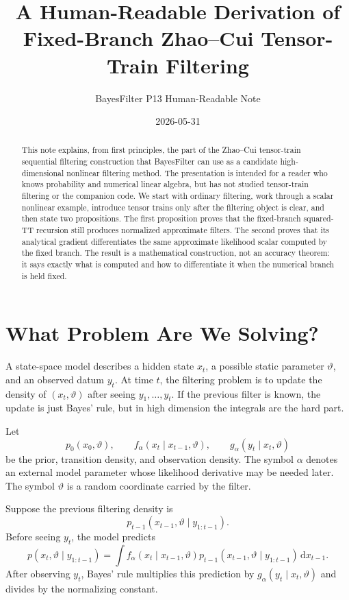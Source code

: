 \documentclass[11pt]{article}
\title{A Human-Readable Derivation of Fixed-Branch Zhao--Cui Tensor-Train Filtering}
\author{BayesFilter P13 Human-Readable Note}
\date{2026-05-31}
\newcommand{\dd}{\mathrm{d}}
\theoremstyle{definition}
\theoremstyle{remark}
\begin{document}
\maketitle

\begin{abstract}
This note explains, from first principles, the part of the Zhao--Cui
tensor-train sequential filtering construction that BayesFilter can use as a
candidate high-dimensional nonlinear filtering method.  The presentation is
intended for a reader who knows probability and numerical linear algebra, but
has not studied tensor-train filtering or the companion code.  We start with
ordinary filtering, work through a scalar nonlinear example, introduce tensor
trains only after the filtering object is clear, and then state two
propositions.  The first proposition proves that the fixed-branch squared-TT
recursion still produces normalized approximate filters.  The second proves
that its analytical gradient differentiates the same approximate likelihood
scalar computed by the fixed branch.  The result is a mathematical
construction, not an accuracy theorem: it says exactly what is computed and how
to differentiate it when the numerical branch is held fixed.
\end{abstract}

\section{What Problem Are We Solving?}

A state-space model describes a hidden state \(x_t\), a possible static
parameter \(\vartheta\), and an observed datum \(y_t\).  At time \(t\), the
filtering problem is to update the density of \((x_t,\vartheta)\) after seeing
\(y_1,\ldots,y_t\).  If the previous filter is known, the update is just
Bayes' rule, but in high dimension the integrals are the hard part.

Let
\[
  p_0(x_0,\vartheta),\qquad
  f_\alpha(x_t\mid x_{t-1},\vartheta),\qquad
  g_\alpha(y_t\mid x_t,\vartheta)
\]
be the prior, transition density, and observation density.  The symbol
\(\alpha\) denotes an external model parameter whose likelihood derivative may
be needed later.  The symbol \(\vartheta\) is a random coordinate carried by
the filter.

Suppose the previous filtering density is
\[
  p_{t-1}(x_{t-1},\vartheta\mid y_{1:t-1}).
\]
Before seeing \(y_t\), the model predicts
\[
  p(x_t,\vartheta\mid y_{1:t-1})
  =
  \int
  f_\alpha(x_t\mid x_{t-1},\vartheta)
  p_{t-1}(x_{t-1},\vartheta\mid y_{1:t-1})
  \,\dd x_{t-1}.
\]
After observing \(y_t\), Bayes' rule multiplies this prediction by
\(g_\alpha(y_t\mid x_t,\vartheta)\) and divides by the normalizing constant.
\end{document}
